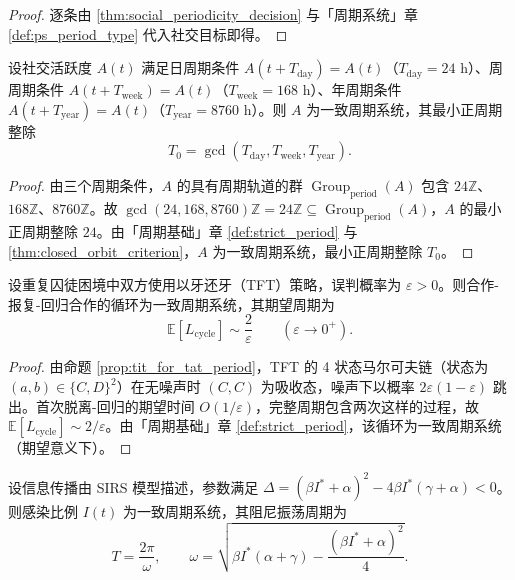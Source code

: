 \begin{proof}
逐条由 \cref{thm:social_periodicity_decision} 与「周期系统」章 \cref{def:ps_period_type} 代入社交目标即得。
\end{proof}

\begin{lemma}[社交节律的周期判定]\label{lem:social_rhythm_periodic}
设社交活跃度 $A(t)$ 满足日周期条件 $A(t+T_{\text{day}})=A(t)$（$T_{\text{day}}=24$ h）、周周期条件 $A(t+T_{\text{week}})=A(t)$（$T_{\text{week}}=168$ h）、年周期条件 $A(t+T_{\text{year}})=A(t)$（$T_{\text{year}}=8760$ h）。则 $A$ 为一致周期系统，其最小正周期整除
\[
T_0=\gcd(T_{\text{day}},T_{\text{week}},T_{\text{year}}).
\]
\end{lemma}

\begin{proof}
由三个周期条件，$A$ 的具有周期轨道的群 $\operatorname{Group}_{\mathrm{period}}(A)$ 包含 $24\mathbb Z$、$168\mathbb Z$、$8760\mathbb Z$。故 $\gcd(24,168,8760)\mathbb Z=24\mathbb Z\subseteq\operatorname{Group}_{\mathrm{period}}(A)$，$A$ 的最小正周期整除 $24$。由「周期基础」章 \cref{def:strict_period} 与 \cref{thm:closed_orbit_criterion}，$A$ 为一致周期系统，最小正周期整除 $T_0$。
\end{proof}

\begin{lemma}\label{lem:tft_periodic}
设重复囚徒困境中双方使用以牙还牙（TFT）策略，误判概率为 $\varepsilon>0$。则合作-报复-回归合作的循环为一致周期系统，其期望周期为
\[
\mathbb{E}[L_{\text{cycle}}]\sim \frac{2}{\varepsilon}\qquad(\varepsilon\to0^+).
\]
\end{lemma}

\begin{proof}
由命题 \ref{prop:tit_for_tat_period}，TFT 的 4 状态马尔可夫链（状态为 $(a,b)\in\{C,D\}^2$）在无噪声时 $(C,C)$ 为吸收态，噪声下以概率 $2\varepsilon(1-\varepsilon)$ 跳出。首次脱离-回归的期望时间 $O(1/\varepsilon)$，完整周期包含两次这样的过程，故 $\mathbb{E}[L_{\text{cycle}}]\sim2/\varepsilon$。由「周期基础」章 \cref{def:strict_period}，该循环为一致周期系统（期望意义下）。
\end{proof}

\begin{lemma}\label{lem:sirs_periodic}
设信息传播由 SIRS 模型描述，参数满足 $\Delta=(\beta I^*+\alpha)^2-4\beta I^*(\gamma+\alpha)<0$。则感染比例 $I(t)$ 为一致周期系统，其阻尼振荡周期为
\[
T=\frac{2\pi}{\omega},\qquad \omega=\sqrt{\beta I^*(\alpha+\gamma)-\frac{(\beta I^*+\alpha)^2}{4}}.
\]
\end{lemma}

